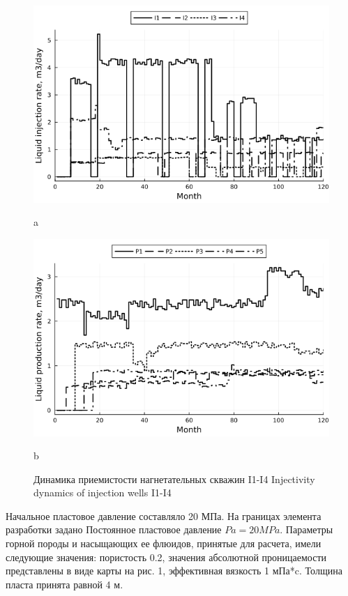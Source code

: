 \documentclass{article}
\begin{document}
\begin{figure}
	\centering
	\begin{minipage}{0.5\linewidth}
		\includegraphics[width=1\textwidth]{fig2a}
		\caption{a}
		\label{inj_rate}
	\end{minipage}%
	\begin{minipage}{0.5\linewidth}
		\centering
		\includegraphics[width=1\textwidth]{fig2b}
		\caption{b}
		\label{prod_rate}
	\end{minipage}
	\caption{Динамика приемистости нагнетательных скважин I1-I4 Injectivity dynamics of injection wells I1-I4}
\end{figure}

 Начальное пластовое давление составляло 20 МПа. На границах элемента разработки задано Постоянное пластовое давление $Pa = 20 MPa$. Параметры горной породы и насыщающих ее флюидов, принятые для расчета, имели следующие значения: пористость 0.2, значения абсолютной проницаемости представлены в виде карты на рис. 1, эффективная вязкость 1 мПа*c. Толщина пласта принята равной 4 м.
\end{document}
